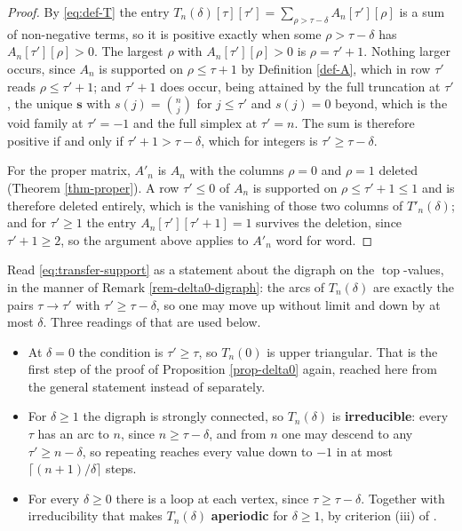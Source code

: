 \documentclass[11pt, a4paper, abstract=yes]{scrartcl}
\theoremstyle{definition}
\theoremstyle{remark}
\theoremstyle{plain}
\newcommand{\vek}[1]{\boldsymbol{#1}}
\newcommand{\tp}{\operatorname{top}}
\let\autocite\cite
\begin{document}
\begin{proof}
By \eqref{eq:def-T} the entry \(T_n(\delta)[\tau][\tau']=\sum_{\rho>\tau-\delta}A_n[\tau'][\rho]\)
is a sum of non-negative terms, so it is positive exactly when some \(\rho>\tau-\delta\) has
\(A_n[\tau'][\rho]>0\). The largest \(\rho\) with \(A_n[\tau'][\rho]>0\) is \(\rho=\tau'+1\).
Nothing larger occurs, since \(A_n\) is supported on \(\rho\le\tau+1\) by Definition \ref{def-A},
which in row \(\tau'\) reads \(\rho\le\tau'+1\); and \(\tau'+1\) does occur, being attained by the
full truncation at \(\tau'\), the unique \(\vek s\) with \(s(j)=\binom nj\) for \(j\le\tau'\) and
\(s(j)=0\) beyond, which is the void family at \(\tau'=-1\) and the full simplex at \(\tau'=n\).
The sum is therefore positive if and only if \(\tau'+1>\tau-\delta\), which for integers is
\(\tau'\ge\tau-\delta\).

For the proper matrix, \(A'_n\) is \(A_n\) with the columns \(\rho=0\) and \(\rho=1\) deleted
(Theorem \ref{thm-proper}). A row \(\tau'\le0\) of \(A_n\) is supported on \(\rho\le\tau'+1\le1\) and
is therefore deleted entirely, which is the vanishing of those two columns of \(T'_n(\delta)\); and
for \(\tau'\ge1\) the entry \(A_n[\tau'][\tau'+1]=1\) survives the deletion, since \(\tau'+1\ge2\),
so the argument above applies to \(A'_n\) word for word.
\end{proof}

Read \eqref{eq:transfer-support} as a statement about the digraph on the \(\tp\)-values, in the
manner of Remark \ref{rem-delta0-digraph}: the arcs of \(T_n(\delta)\) are exactly the pairs
\(\tau\to\tau'\) with \(\tau'\ge\tau-\delta\), so one may move up without limit and down by at most
\(\delta\). Three readings of that are used below.

\begin{itemize}
\item At \(\delta=0\) the condition is \(\tau'\ge\tau\), so \(T_n(0)\) is upper triangular. That is the
first step of the proof of Proposition \ref{prop-delta0} again, reached here from the general
statement instead of separately.
\item For \(\delta\ge1\) the digraph is strongly connected, so \(T_n(\delta)\) is \textbf{irreducible}: every
\(\tau\) has an arc to \(n\), since \(n\ge\tau-\delta\), and from \(n\) one may descend to any
\(\tau'\ge n-\delta\), so repeating reaches every value down to \(-1\) in at most
\(\lceil(n+1)/\delta\rceil\) steps.
\item For every \(\delta\ge0\) there is a loop at each vertex, since \(\tau\ge\tau-\delta\). Together
with irreducibility that makes \(T_n(\delta)\) \textbf{aperiodic} for \(\delta\ge1\), by criterion (iii)
of \autocite[Note V.31]{FlajoletSedgewick2009}.
\end{itemize}
\end{document}
